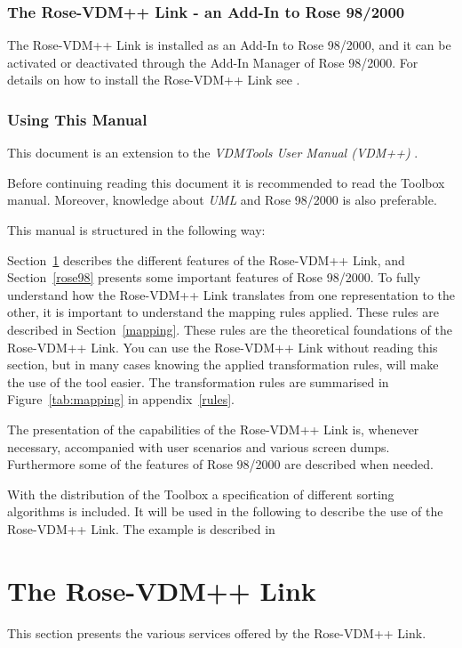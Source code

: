 \documentclass[\pformat,12pt]{article}
\newcommand{\vdmpp}{VDM++}
\newcommand{\link}{Rose-\vdmpp{} Link}
\newcommand{\rose}{Rose 98/2000}
\begin{document}
\subsubsection*{The \link{} - an Add-In to \rose{}}
The \link{} is installed as an Add-In to \rose{}, and it can be
activated or deactivated through the Add-In Manager of \rose{}. For
details on how to install the \link{} see \cite{InstallPPMan-SCSK}.

\subsubsection*{Using This Manual}

This document is an extension to the {\it VDMTools User Manual (\vdmpp{})} \cite{UserManPP-SCSK}.

Before continuing reading this
document it is recommended to read the Toolbox manual.
Moreover, knowledge about {\it UML} \cite{Booch&97} and \rose{} 
\cite{Rational98} is also preferable.

This manual is structured in the following way:

Section~\ref{roselink} describes the different features of the
\link{}, and Section~\ref{rose98} presents some important features
of \rose{}. To fully understand how the \link{} translates from one
representation to the other, it is important to understand the mapping
rules applied. These rules are described in
Section~\ref{mapping}. These rules are the theoretical
foundations of the \link{}. You can use the \link{} without reading
this section, but in many cases knowing the applied transformation
rules, will make the use of the tool easier. The transformation rules
are summarised in Figure~\ref{tab:mapping} in appendix~\ref{rules}.

The presentation of the capabilities of the \link{} is, whenever
necessary, accompanied with user scenarios and various screen
dumps. Furthermore some of the features of \rose{} are described
when needed.
  
With the distribution of the Toolbox a specification of different
sorting algorithms is included. It will be used in the following to
describe the use of the \link{}.  The example is described in
\cite{SortExpp-SCSK}

\newpage
\section{The Rose-VDM++ Link}
\label{roselink}

This section presents the various services offered by the \link{}.  
\end{document}
